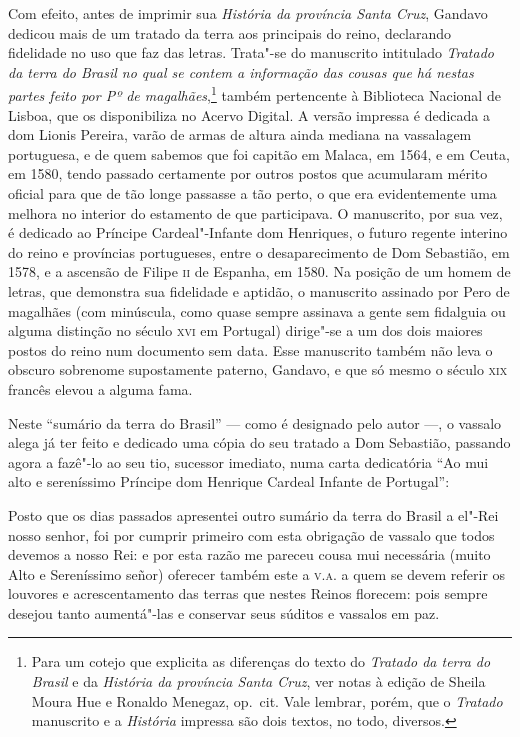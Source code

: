 Com efeito, antes de imprimir sua \textit{História da província Santa Cruz},
Gandavo dedicou mais de um tratado da terra aos principais do reino,
declarando fidelidade no uso que faz das letras. Trata"-se do manuscrito
intitulado \textit{Tratado da terra do Brasil no qual se contem a informação
das cousas que há nestas partes feito por Pº de magalhães},\footnote{ Para 
um cotejo que explicita as diferenças do texto
do \textit{Tratado da terra do Brasil} e da \textit{História da província Santa Cruz},
ver notas à edição de Sheila Moura Hue e Ronaldo Menegaz, op.~cit. Vale
lembrar, porém, que o \textit{Tratado} manuscrito e a \textit{História} impressa são
dois textos, no todo, diversos.} também pertencente à Biblioteca
Nacional de Lisboa, que os disponibiliza no Acervo Digital. A versão
impressa é dedicada a dom Lionis Pereira, varão de armas de altura
ainda mediana na vassalagem portuguesa, e de quem sabemos que foi
capitão em Malaca, em 1564, e em Ceuta, em 1580, tendo passado
certamente por outros postos que acumularam mérito oficial para que de
tão longe passasse a tão perto, o que era evidentemente uma melhora no
interior do estamento de que participava. O manuscrito, por sua vez, é
dedicado ao Príncipe Cardeal"-Infante dom Henriques, o futuro regente
interino do reino e províncias portugueses, entre o desaparecimento de
Dom Sebastião, em 1578, e a ascensão de Filipe \textsc{ii} de Espanha, em 1580.
Na posição de um homem de letras, que demonstra sua fidelidade e
aptidão, o manuscrito assinado por Pero de magalhães (com minúscula,
como quase sempre assinava a gente sem fidalguia ou alguma distinção no
século \textsc{xvi} em Portugal) dirige"-se a um dos dois maiores postos do reino
num documento sem data. Esse manuscrito também não leva o obscuro
sobrenome supostamente paterno, Gandavo, e que só mesmo o século \textsc{xix}
francês elevou a alguma fama.

Neste ``sumário da terra do Brasil'' --- como é
designado pelo autor ---, o vassalo alega já ter feito e dedicado uma
cópia do seu tratado a Dom Sebastião, passando agora a fazê"-lo ao seu
tio, sucessor imediato, numa carta dedicatória ``Ao mui
alto e sereníssimo Príncipe dom Henrique Cardeal Infante de Portugal'':
\begin{hedraquote}
Posto que os dias passados apresentei outro sumário da terra do Brasil a
el"-Rei nosso senhor, foi por cumprir primeiro com esta obrigação de
vassalo que todos devemos a nosso Rei: e por esta razão me pareceu
cousa mui necessária (muito Alto e Sereníssimo señor) oferecer também
este a \textsc{v.a.} a quem se devem referir os louvores e acrescentamento das
terras que nestes Reinos florecem: pois sempre desejou tanto
aumentá"-las e conservar seus súditos e vassalos em paz.
\end{hedraquote}

